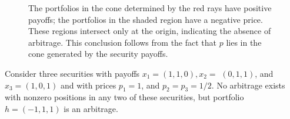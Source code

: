 \documentclass[\topdir/lecture\_notes.tex]{subfiles}
\begin{document}
\begin{figure}
\begin{center}
    \end{center}
    \caption{The portfolios in the cone determined by the red rays have positive payoffs; the portfolios in the shaded region have a negative price. These regions intersect only at the origin, indicating the absence of arbitrage. This conclusion follows from the fact that $p$ lies in the cone generated by the security payoffs.}
    \label{fig:no_arbitrage_case}
\end{figure}

\begin{example}\label{ex:three_securities_arbitrage}
Consider three securities with payoffs $x_{1}=(1,1,0), x_{2}=$ $(0,1,1)$, and $x_{3}=(1,0,1)$ and with prices $p_{1}=1$, and $p_{2}=p_{3}=1 / 2$. No arbitrage exists with nonzero positions in any two of these securities, but portfolio $h=(-1,1,1)$ is an arbitrage.
\end{example}
\end{document}
